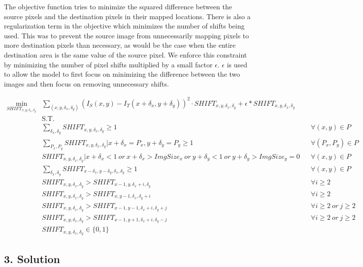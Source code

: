 \documentclass[11pt]{article}
\begin{document}
The objective function tries to minimize the squared difference between
the source pixels and the destination pixels in their mapped locations.
There is also a regularization term in the objective which minimizes the
number of shifts being used. This was to prevent the source image from
unnecessarily mapping pixels to more destination pixels than necessary,
as would be the case when the entire destination area is the same value
of the source pixel. We enforce this constraint by minimizing the number
of pixel shifts multiplied by a small factor \(\epsilon\). \(\epsilon\)
is used to allow the model to first focus on minimizing the difference
between the two images and then focus on removing unnecessary shifts.

\[\begin{align*}
\min_{SHIFT_{x,y, \delta_x, \delta_y}} &\sum_{(x,y, \delta_x, \delta_y)} \left(I_S(x,y) - I_T(x+\delta_x,y+\delta_y)\right)^2 \cdot SHIFT_{x,y,\delta_x,\delta_y} + \epsilon * SHIFT_{x,y,\delta_x,\delta_y} \\
&\text{S.T.} \\
& \sum_{\delta_x,\delta_y} SHIFT_{x,y,\delta_x,\delta_y} \geq 1 && \forall (x,y)\in P \\
& \sum_{P_x, P_y} SHIFT_{x,y,\delta_x,\delta_y} | x+\delta_x = P_x, y+\delta_y = P_y \geq 1 && \forall (P_x,P_y)\in P \\
& SHIFT_{x,y,\delta_x,\delta_y} | x+\delta_x < 1\ or\ x+\delta_x > ImgSize_x\ or\ y+\delta_y < 1\ or\ y+\delta_y > ImgSize_y = 0 && \forall (x, y)\in P \\
& \sum_{\delta_x,\delta_y} SHIFT_{x-\delta_x,y-\delta_y,\delta_x,\delta_y} \geq 1 && \forall (x,y)\in P \\
& SHIFT_{x,y,\delta_x,\delta_y} > SHIFT_{x-1,y,\delta_x+i,\delta_y} && \forall i \geq 2 \\
& SHIFT_{x,y,\delta_x,\delta_y} > SHIFT_{x,y-1,\delta_x,\delta_y+i} && \forall i \geq 2 \\
& SHIFT_{x,y,\delta_x,\delta_y} > SHIFT_{x-1,y-1,\delta_x+i,\delta_y+j} && \forall i \geq 2\ or\ j \geq 2 \\
& SHIFT_{x,y,\delta_x,\delta_y} > SHIFT_{x-1,y+1,\delta_x+i,\delta_y-j} && \forall i \geq 2\ or\ j \geq 2 \\
&SHIFT_{x,y,\delta_x,\delta_y}\in \{0,1\}
\end{align*}\]

    \hypertarget{solution}{%
\subsection{3. Solution}\label{solution}}
\end{document}

